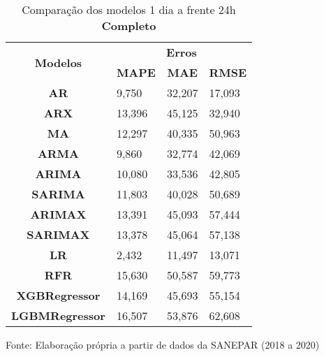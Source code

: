 \begin{table}[H]
	\centering
	\caption{Comparação dos modelos 1 dia a frente 24h \textbf{Completo} }\label{tb:1-24cm}
	\begin{tabular}{@{}clll@{}}
		\toprule
		\multirow{2}{*}{\textbf{Modelos}} & \multicolumn{3}{c}{\textbf{Erros}}                                                                       \\ \cmidrule(l){2-4} 
		& \multicolumn{1}{c}{\textbf{MAPE}} & \multicolumn{1}{c}{\textbf{MAE}} & \multicolumn{1}{c}{\textbf{RMSE}} \\ \hline
\textbf{AR}                       & 9,750                             & 32,207                           & 17,093                            \\
\textbf{ARX}                      & 13,396                            & 45,125                           & 32,940                            \\
\textbf{MA}                       & 12,297                            & 40,335                           & 50,963                            \\
\textbf{ARMA}                     & 9,860                             & 32,774                           & 42,069                            \\
\textbf{ARIMA}                    & 10,080                            & 33,536                           & 42,805                            \\
\textbf{SARIMA}                   & 11,803                            & 40,028                           & 50,689                            \\
\textbf{ARIMAX}                   & 13,391                            & 45,093                           & 57,444                            \\
\textbf{SARIMAX}                  & 13,378                            & 45,064                           & 57,138                            \\
\textbf{LR}        & 2,432                             & 11,497                           & 13,071                            \\
\textbf{RFR}  & 15,630                            & 50,587                           & 59,773                            \\
\textbf{XGBRegressor}             & 14,169                            & 45,693                           & 55,154                            \\
\textbf{LGBMRegressor}            & 16,507                            & 53,876                           & 62,608                            \\ \bottomrule
	\end{tabular}

Fonte: Elaboração própria a partir de dados da SANEPAR (2018 a 2020)
\end{table}


